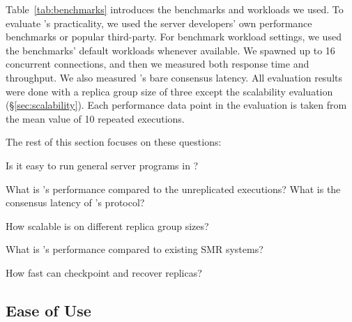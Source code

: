 Table~\ref{tab:benchmarks} introduces the benchmarks and workloads we used. To 
evaluate \xxx's practicality, we used the server developers' own performance 
benchmarks or popular third-party. For benchmark workload settings, we used the 
benchmarks' default workloads whenever available. We spawned up to 16 
concurrent connections, and then we measured both response time and 
throughput. We also measured \xxx's bare consensus latency. All evaluation 
results were done with a replica group size of three except the scalability 
evaluation (\S\ref{sec:scalability}). Each performance data point in the 
evaluation is taken from the mean value of 10 repeated executions.

The rest of this section focuses on these questions:

\begin{tightenum}

\item[\S\ref{sec:ease-of-use}:] Is it easy to run general server programs 
in \xxx?

\item[\S\ref{sec:overhead}:] What is \xxx's performance compared to the 
unreplicated executions? What is the consensus latency of \xxx's \paxos 
protocol?

\item[\S\ref{sec:scalability}:] How scalable is \xxx on different replica group 
sizes?

\item[\S\ref{sec:compare}:] What is \xxx's performance compared to existing 
SMR systems?

\item[\S\ref{sec:robust}:] How fast can \xxx checkpoint and recover replicas?



\end{tightenum}

\subsection{Ease of Use} \label{sec:ease-of-use}

